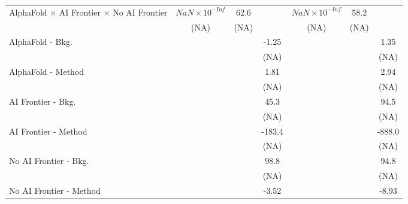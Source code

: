 \begin{tabular}{lcccccc}
   AlphaFold $\times$ AI Frontier $\times$ No AI Frontier                     & $NaN\times 10^{-Inf}$  & 62.6   &        & $NaN\times 10^{-Inf}$  & 58.2   &   \\   
                                                                              & (NA)                   & (NA)   &        & (NA)                   & (NA)   &   \\   
   AlphaFold - Bkg.                                                           &                        &        & -1.25  &                        &        & 1.35\\   
                                                                              &                        &        & (NA)   &                        &        & (NA)\\   
   AlphaFold - Method                                                         &                        &        & 1.81   &                        &        & 2.94\\   
                                                                              &                        &        & (NA)   &                        &        & (NA)\\   
   AI Frontier - Bkg.                                                         &                        &        & 45.3   &                        &        & 94.5\\   
                                                                              &                        &        & (NA)   &                        &        & (NA)\\   
   AI Frontier - Method                                                       &                        &        & -183.4 &                        &        & -888.0\\   
                                                                              &                        &        & (NA)   &                        &        & (NA)\\   
   No AI Frontier - Bkg.                                                      &                        &        & 98.8   &                        &        & 94.8\\   
                                                                              &                        &        & (NA)   &                        &        & (NA)\\   
   No AI Frontier - Method                                                    &                        &        & -3.52  &                        &        & -8.93\\   

\end{tabular}
